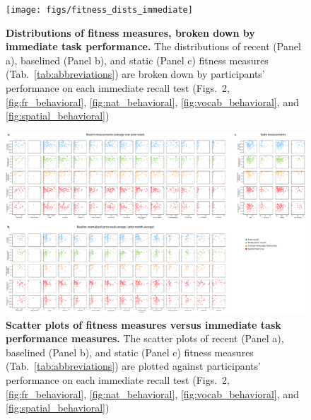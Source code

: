 \documentclass[10pt]{article}
\newcommand{\immediateBehavior}{2}
\begin{document}
\begin{figure}
\centering
\texttt{[image: figs/fitness\_dists\_immediate]}
\caption{\textbf{Distributions of fitness measures, broken down
    by immediate task performance.}  The distributions of recent
  (Panel a), baselined (Panel b), and static (Panel c) fitness
  measures (Tab.~\ref{tab:abbreviations}) are broken down by
  participants' performance on each immediate recall test
  (Figs.~\immediateBehavior, \ref{fig:fr_behavioral},
  \ref{fig:nat_behavioral}, \ref{fig:vocab_behavioral}, and \ref{fig:spatial_behavioral})}
\label{fig:fitness_dists_immediate}
\end{figure}

\begin{figure}
\centering
\includegraphics[width=\textwidth]{figs/fitness_scatter_immediate}
\caption{\textbf{Scatter plots of fitness measures versus
    immediate task performance measures.}  The scatter plots of recent
  (Panel a), baselined (Panel b), and static (Panel c) fitness
  measures (Tab.~\ref{tab:abbreviations}) are plotted against 
  participants' performance on each immediate recall test
  (Figs.~\immediateBehavior, \ref{fig:fr_behavioral}, \ref{fig:nat_behavioral}, \ref{fig:vocab_behavioral}, and \ref{fig:spatial_behavioral})}
\label{fig:fitness_scatters_immediate}
\end{figure}
\end{document}
